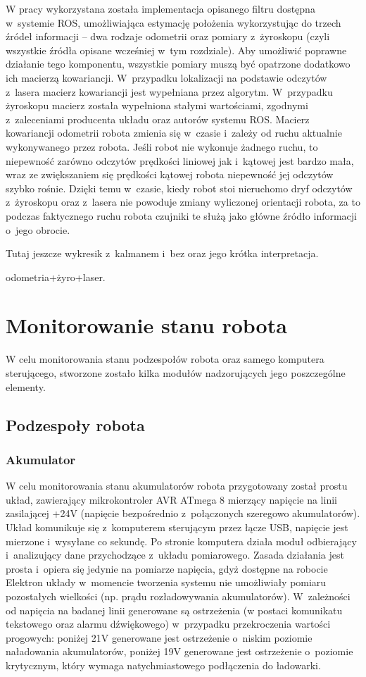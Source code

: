 W pracy wykorzystana została implementacja opisanego filtru dostępna w~systemie ROS,
umożliwiająca estymację położenia wykorzystując do trzech źródeł informacji -- dwa rodzaje
odometrii oraz pomiary z~żyroskopu (czyli wszystkie źródła opisane wcześniej w~tym rozdziale).
Aby umożliwić poprawne działanie tego komponentu, wszystkie pomiary muszą być opatrzone
dodatkowo ich macierzą kowariancji. W~przypadku lokalizacji na podstawie odczytów z~lasera
macierz kowariancji jest wypełniana przez algorytm. W~przypadku żyroskopu macierz
została wypełniona stałymi wartościami, zgodnymi z~zaleceniami producenta układu oraz
autorów systemu ROS. Macierz kowariancji odometrii robota zmienia się w~czasie i~zależy
od ruchu aktualnie wykonywanego przez robota. Jeśli robot nie wykonuje żadnego ruchu,
to niepewność zarówno odczytów prędkości liniowej jak i~kątowej jest bardzo mała,
wraz ze zwiększaniem się prędkości kątowej robota niepewność jej odczytów szybko rośnie.
Dzięki temu w~czasie, kiedy robot stoi nieruchomo dryf odczytów z~żyroskopu oraz z~lasera
nie powoduje zmiany wyliczonej orientacji robota, za to podczas faktycznego ruchu robota
czujniki te służą jako główne źródło informacji o~jego obrocie.

Tutaj jeszcze wykresik z~kalmanem i~bez oraz jego krótka interpretacja.

odometria+żyro+laser.

\section{Monitorowanie stanu robota}

W celu monitorowania stanu podzespołów robota oraz samego komputera sterującego,
stworzone zostało kilka modułów nadzorujących jego poszczególne elementy.

\subsection{Podzespoły robota}

\subsubsection{Akumulator}

W celu monitorowania stanu akumulatorów robota przygotowany został prostu układ,
zawierający mikrokontroler AVR ATmega 8 mierzący napięcie na linii
zasilającej +24V (napięcie bezpośrednio z~połączonych szeregowo akumulatorów).
Układ komunikuje się z~komputerem sterującym przez łącze USB, napięcie jest
mierzone i~wysyłane co sekundę. Po stronie komputera działa moduł odbierający 
i~analizujący dane przychodzące z~układu pomiarowego. Zasada działania jest prosta
i~opiera się jedynie na pomiarze napięcia, gdyż dostępne na robocie Elektron
układy w~momencie tworzenia systemu nie umożliwiały pomiaru pozostałych
wielkości (np. prądu rozładowywania akumulatorów). W~zależności od napięcia na
badanej linii generowane są ostrzeżenia (w postaci komunikatu tekstowego oraz
alarmu dźwiękowego) w~przypadku przekroczenia wartości progowych: poniżej 21V
generowane jest ostrzeżenie o~niskim poziomie naładowania akumulatorów, poniżej
19V generowane jest ostrzeżenie o~poziomie krytycznym, który wymaga
natychmiastowego podłączenia do ładowarki.

